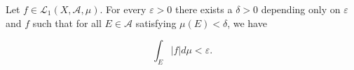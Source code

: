 Let $f \in \mathcal{L}_1(X, \mathcal{A}, \mu)$. For every $\varepsilon > 0$ there exists a $\delta > 0$ depending only on $\varepsilon$ and $f$ such that for all $E \in \mathcal{A}$ satisfying $\mu(E) < \delta$, we have

$$\int_E |f| d\mu < \varepsilon.$$